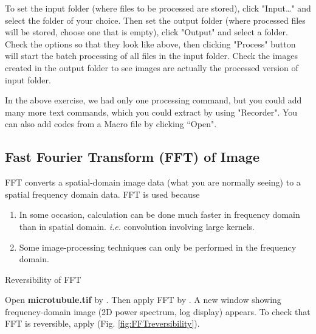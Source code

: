 \begin{indentexercise}{1}
To set the input folder (where files to be processed are stored), click
"Input\ldots" and select the
folder of your choice. Then set the output folder (where processed files will be
stored, choose one that is empty), click
"Output" and select a folder.
Check the options so that they look like above, then clicking
"Process" button will start the batch
processing of all files in the input folder. Check the images created
in the output folder to see images are actually the processed version
of input folder.
\end{indentexercise}

In the above exercise, we had only one processing command, but you could add
many more text commands, which you could extract by using
"Recorder". You can also add codes from a Macro file by clicking ``Open".

\subsection{Fast Fourier Transform (FFT) of Image}

FFT converts a spatial-domain image data (what you are normally seeing) to a spatial frequency domain data. FFT is used because 
\begin{enumerate}
\item In some occasion, calculation can be done much faster in frequency domain
than in spatial domain. \textit{i.e.} convolution involving large kernels. 
\item Some image-processing techniques can only be performed in the frequency domain. 
\end{enumerate}

\begin{indentexercise}{1}
Reversibility of FFT

Open \textbf{microtubule.tif} by . Then apply FFT by . A new window showing frequency-domain image (2D power spectrum, log display) appears. To check that FFT is reversible, apply  (Fig. \ref{fig:FFTreversibility}).

\end{indentexercise}

